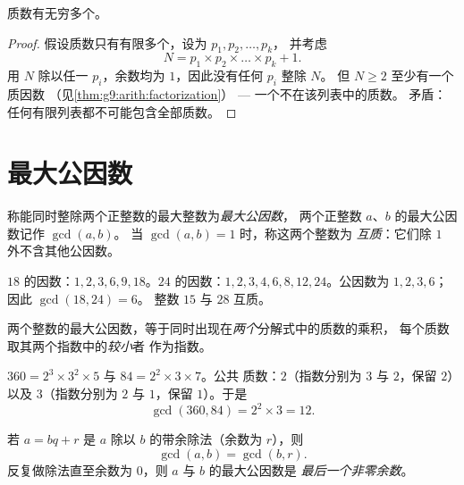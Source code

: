 \begin{theorem}[欧几里得]\label{thm:g9:arith:euclid}
质数有无穷多个。
\end{theorem}

\begin{proof}
假设质数只有有限多个，设为 $p_1, p_2, \dots, p_k$，
并考虑
\[
N = p_1 \times p_2 \times \dots \times p_k + 1 .
\]
用 $N$ 除以任一 $p_i$，余数均为 $1$，因此没有任何 $p_i$ 整除 $N$。
但 $N \geq 2$ 至少有一个质因数
（见\cref{thm:g9:arith:factorization}） --- 一个不在该列表中的质数。
矛盾：任何有限列表都不可能包含全部质数。
\end{proof}

\section{最大公因数}

\begin{definition}[最大公因数]\label{def:g9:arith:gcd}
称能同时整除两个正整数的最大整数为\emph{最大公因数}，
两个正整数 $a$、$b$ 的最大公因数记作 $\gcd(a, b)$。
当 $\gcd(a, b) = 1$ 时，称这两个整数为
\emph{互质}：它们除 $1$ 外不含其他公因数。
\end{definition}

\begin{example}
$18$ 的因数：$1, 2, 3, 6, 9, 18$。$24$ 的因数：$1, 2, 3, 4, 6,
8, 12, 24$。公因数为 $1, 2, 3, 6$；因此 $\gcd(18, 24) = 6$。
整数 $15$ 与 $28$ 互质。
\end{example}

\begin{proposition}[由质因数分解求最大公因数]\label{prop:g9:arith:gcdfact}
两个整数的最大公因数，等于同时出现在\emph{两个}分解式中的质数的乘积，
每个质数取其两个指数中的\emph{较小}者
作为指数。
\end{proposition}
\admitted

\begin{example}\label{ex:g9:arith:gcdfact}
$360 = 2^3 \times 3^2 \times 5$ 与 $84 = 2^2 \times 3 \times 7$。公共
质数：$2$（指数分别为 $3$ 与 $2$，保留 $2$）以及 $3$（指数分别为 $2$ 与
$1$，保留 $1$）。于是
\[
\gcd(360, 84) = 2^2 \times 3 = 12 .
\]
\end{example}

\begin{theorem}[欧几里得算法]\label{thm:g9:arith:euclidalgo}
若 $a = bq + r$ 是 $a$ 除以 $b$ 的带余除法（余数为 $r$），则
\[
\gcd(a, b) = \gcd(b, r).
\]
反复做除法直至余数为 $0$，则 $a$ 与 $b$ 的最大公因数是
\emph{最后一个非零余数}。
\end{theorem}

